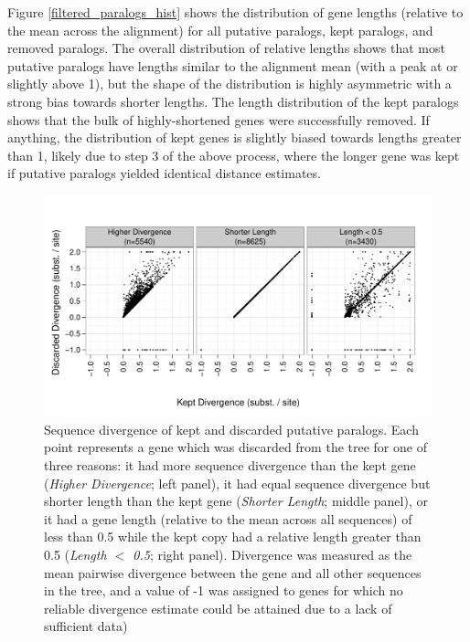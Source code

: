 Figure \ref{filtered_paralogs_hist} shows the distribution of gene
lengths (relative to the mean across the alignment) for all putative
paralogs, kept paralogs, and removed paralogs. The overall
distribution of relative lengths shows that most putative paralogs
have lengths similar to the alignment mean (with a peak at or slightly
above 1), but the shape of the distribution is highly asymmetric with
a strong bias towards shorter lengths. The length distribution of the
kept paralogs shows that the bulk of highly-shortened genes were
successfully removed. If anything, the distribution of kept genes is
slightly biased towards lengths greater than 1, likely due to step 3
of the above process, where the longer gene was kept if putative
paralogs yielded identical distance estimates.

\begin{figure}[hb]
\centering
\includegraphics[scale=0.7]{Figs/filtered_paralogs_scatter.pdf}
\caption{Sequence divergence of kept and discarded putative
  paralogs. Each point represents a gene which was discarded from the
  tree for one of three reasons: it had more sequence divergence than
  the kept gene (\emph{Higher Divergence}; left panel), it had equal
  sequence divergence but shorter length than the kept gene
  (\emph{Shorter Length}; middle panel), or it had a gene length
  (relative to the mean across all sequences) of less than 0.5 while
  the kept copy had a relative length greater than 0.5 (\emph{Length
    $<$ 0.5}; right panel). Divergence was measured as the mean
  pairwise divergence between the gene and all other sequences in the
  tree, and a value of -1 was assigned to genes for which no reliable
  divergence estimate could be attained due to a lack of sufficient
  data)}
\label{filtered_paralogs_scatter}
\end{figure}

